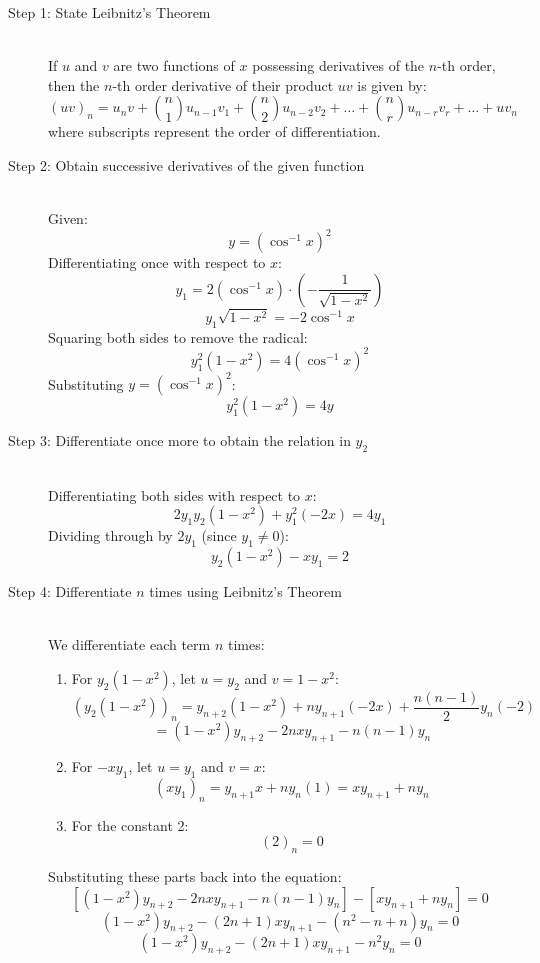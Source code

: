 \documentclass[11pt, a4paper]{article}
\begin{document}
\begin{description}
    \item[Step 1: State Leibnitz's Theorem] \ \\
    If $u$ and $v$ are two functions of $x$ possessing derivatives of the $n$-th order, then the $n$-th order derivative of their product $uv$ is given by:
    \[ (uv)_n = u_n v + \binom{n}{1} u_{n-1} v_1 + \binom{n}{2} u_{n-2} v_2 + \dots + \binom{n}{r} u_{n-r} v_r + \dots + u v_n \]
    where subscripts represent the order of differentiation.

    \item[Step 2: Obtain successive derivatives of the given function] \ \\
    Given:
    \[ y = (\cos^{-1} x)^2 \]
    Differentiating once with respect to $x$:
    \[ y_1 = 2(\cos^{-1} x) \cdot \left(-\frac{1}{\sqrt{1-x^2}}\right) \]
    \[ y_1 \sqrt{1-x^2} = -2\cos^{-1} x \]
    Squaring both sides to remove the radical:
    \[ y_1^2 (1-x^2) = 4(\cos^{-1} x)^2 \]
    Substituting $y = (\cos^{-1} x)^2$:
    \[ y_1^2 (1-x^2) = 4y \]

    \item[Step 3: Differentiate once more to obtain the relation in $y_2$] \ \\
    Differentiating both sides with respect to $x$:
    \[ 2y_1 y_2 (1-x^2) + y_1^2 (-2x) = 4y_1 \]
    Dividing through by $2y_1$ (since $y_1 \neq 0$):
    \[ y_2 (1-x^2) - x y_1 = 2 \]

    \item[Step 4: Differentiate $n$ times using Leibnitz's Theorem] \ \\
    We differentiate each term $n$ times:
    \begin{enumerate}
        \item For $y_2(1-x^2)$, let $u = y_2$ and $v = 1-x^2$:
        \[ \left(y_2 (1-x^2)\right)_n = y_{n+2}(1-x^2) + n y_{n+1}(-2x) + \frac{n(n-1)}{2} y_n (-2) \]
        \[ = (1-x^2)y_{n+2} - 2nxy_{n+1} - n(n-1)y_n \]

        \item For $-xy_1$, let $u = y_1$ and $v = x$:
        \[ \left(x y_1\right)_n = y_{n+1} x + n y_n (1) = x y_{n+1} + n y_n \]

        \item For the constant 2:
        \[ (2)_n = 0 \]
    \end{enumerate}
    Substituting these parts back into the equation:
    \[ \left[(1-x^2)y_{n+2} - 2nxy_{n+1} - n(n-1)y_n\right] - \left[x y_{n+1} + n y_n\right] = 0 \]
    \[ (1-x^2)y_{n+2} - (2n+1)xy_{n+1} - (n^2 - n + n) y_n = 0 \]
    \[ (1-x^2)y_{n+2} - (2n+1)xy_{n+1} - n^2 y_n = 0 \]
\end{description}
\end{document}
